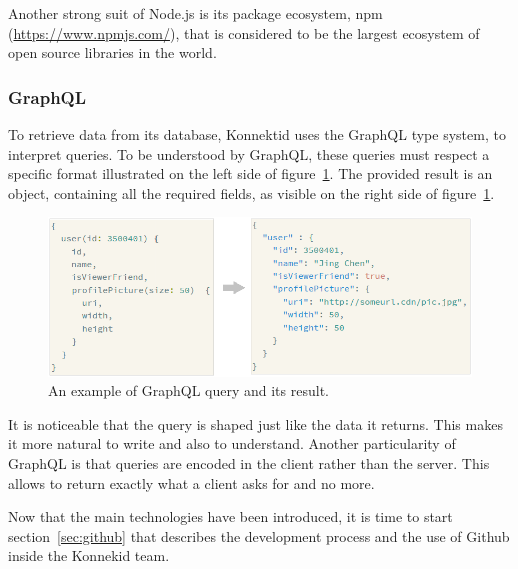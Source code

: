Another strong suit of Node.js is its package ecosystem, npm (\url{https://www.npmjs.com/}), that is considered to be the largest ecosystem of open source libraries
in the world.

\subsubsection{GraphQL}
\label{sssec:grqphql}

To retrieve data from its database, Konnektid uses the GraphQL type system, to interpret queries. To be understood by GraphQL, these queries must respect a specific
format illustrated on the left side of {\sc figure}~\ref{fig:query}. The provided result is an object, containing all the required fields, as visible on the right side
of {\sc figure}~\ref{fig:query}.

\begin{figure}[H]
    \centering
    \includegraphics[scale=0.8]{figure/query.png}
    \caption{An example of GraphQL query and its result.}
    \label{fig:query}
\end{figure}

It is noticeable that the query is shaped just like the data it returns. This makes it more natural to write and also to understand.
Another particularity of GraphQL is that queries are encoded in the client rather than the server. This allows to return exactly what a client asks for and no more.

Now that the main technologies have been introduced, it is time to start {\sc section}~\ref{sec:github} that describes the development process and the use
of Github inside the Konnekid team.
